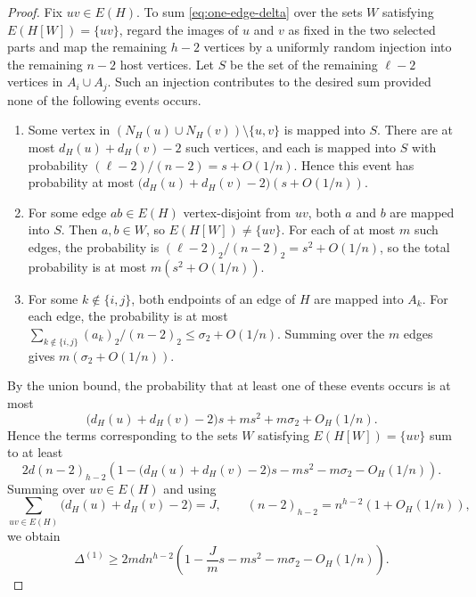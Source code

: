 \documentclass[10pt,a4paper]{amsart}
\begin{document}
\begin{proof}
Fix $uv\in E(H)$. To sum \eqref{eq:one-edge-delta} over the sets $W$ satisfying $E(H[W])=\{uv\}$, regard the images of $u$ and $v$ as fixed in the two selected parts and map the remaining $h-2$ vertices by a uniformly random injection into the remaining $n-2$ host vertices. Let $S$ be the set of the remaining $\ell-2$ vertices in $A_i\cup A_j$. Such an injection contributes to the desired sum provided none of the following events occurs.
\begin{enumerate}
\renewcommand{\labelenumi}{(\roman{enumi})}
\item Some vertex in $(N_H(u)\cup N_H(v))\setminus\{u,v\}$ is mapped into $S$. There are at most $d_H(u)+d_H(v)-2$ such vertices, and each is mapped into $S$ with probability $(\ell-2)/(n-2)=s+O(1/n)$. Hence this event has probability at most $\bigl(d_H(u)+d_H(v)-2\bigr)(s+O(1/n))$.
\item For some edge $ab\in E(H)$ vertex-disjoint from $uv$, both $a$ and $b$ are mapped into $S$. Then $a,b\in W$, so $E(H[W])\ne\{uv\}$. For each of at most $m$ such edges, the probability is $(\ell-2)_2/(n-2)_2=s^2+O(1/n)$, so the total probability is at most $m(s^2+O(1/n))$.
\item For some $k\notin\{i,j\}$, both endpoints of an edge of $H$ are mapped into $A_k$. For each edge, the probability is at most $\sum_{k\notin\{i,j\}}(a_k)_2/(n-2)_2\le \sigma_2+O(1/n)$. Summing over the $m$ edges gives $m(\sigma_2+O(1/n))$.
\end{enumerate}
By the union bound, the probability that at least one of these events occurs is at most
\[
\bigl(d_H(u)+d_H(v)-2\bigr)s+ms^2+m\sigma_2+O_H(1/n).
\]
Hence the terms corresponding to the sets $W$ satisfying $E(H[W])=\{uv\}$ sum to at least
\[
2d(n-2)_{h-2}
\left(1-\bigl(d_H(u)+d_H(v)-2\bigr)s-ms^2-m\sigma_2-O_H(1/n)\right).
\]
Summing over $uv\in E(H)$ and using
\[
\sum_{uv\in E(H)}\bigl(d_H(u)+d_H(v)-2\bigr)=J,
\qquad
(n-2)_{h-2}=n^{h-2}(1+O_H(1/n)),
\]
we obtain
\begin{equation}
\label{eq:balancing-one-edge}
\Delta^{(1)}
\ge 2mdn^{h-2}\left(1-\frac{J}{m}s-ms^2-m\sigma_2-O_H(1/n)\right).
\end{equation}


\end{proof}
\end{document}
